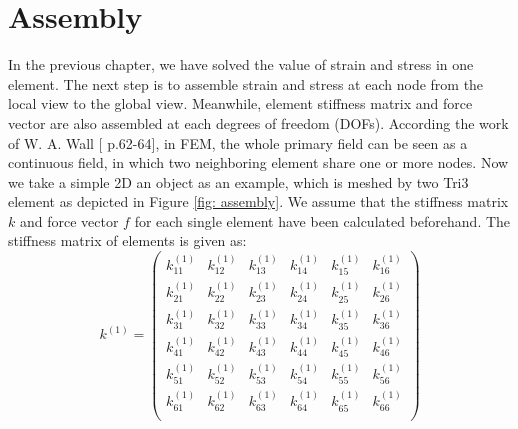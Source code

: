 \section{Assembly}
In the previous chapter, we have solved the value of strain and stress in one element. The next step is to assemble strain and stress at each node from the local view to the global view. Meanwhile, element stiffness matrix and force vector are also assembled at each degrees of freedom (DOFs). According the work of W. A. Wall [\cite{FiniteElement} p.62-64], in FEM, the whole primary field can be seen as a continuous field, in which two neighboring element share one or more nodes. Now we take a simple 2D an object as an example, which is meshed by two Tri3 element as depicted in Figure \ref{fig: assembly}. We assume that the stiffness matrix $k$ and force vector $f$ for each single element have been calculated beforehand. The stiffness matrix of elements is given as:
\begin{equation} \label{eq: k_1}
k^{\left(1\right)} = \begin{pmatrix}
k_{11}^{\left(1\right)} & k_{12}^{\left(1\right)} &  k_{13}^{\left(1\right)} &  k_{14}^{\left(1\right)} & k_{15}^{\left(1\right)}  & k_{16}^{\left(1\right)}   \\[0.3em]
k_{21}^{\left(1\right)} & k_{22}^{\left(1\right)} &  k_{23}^{\left(1\right)} &  k_{24}^{\left(1\right)} & k_{25}^{\left(1\right)}  & k_{26}^{\left(1\right)}   \\[0.3em]
k_{31}^{\left(1\right)} & k_{32}^{\left(1\right)} &  k_{33}^{\left(1\right)} &  k_{34}^{\left(1\right)} & k_{35}^{\left(1\right)}  & k_{36}^{\left(1\right)}   \\[0.3em]
k_{41}^{\left(1\right)} & k_{42}^{\left(1\right)} &  k_{43}^{\left(1\right)} &  k_{44}^{\left(1\right)} & k_{45}^{\left(1\right)}  & k_{46}^{\left(1\right)}   \\[0.3em]
k_{51}^{\left(1\right)} & k_{52}^{\left(1\right)} &  k_{53}^{\left(1\right)} &  k_{54}^{\left(1\right)} & k_{55}^{\left(1\right)}  & k_{56}^{\left(1\right)}   \\[0.3em]
k_{61}^{\left(1\right)} & k_{62}^{\left(1\right)} &  k_{63}^{\left(1\right)} &  k_{64}^{\left(1\right)} & k_{65}^{\left(1\right)}  & k_{66}^{\left(1\right)}   \\[0.3em]
\end{pmatrix} 
\end{equation}	

